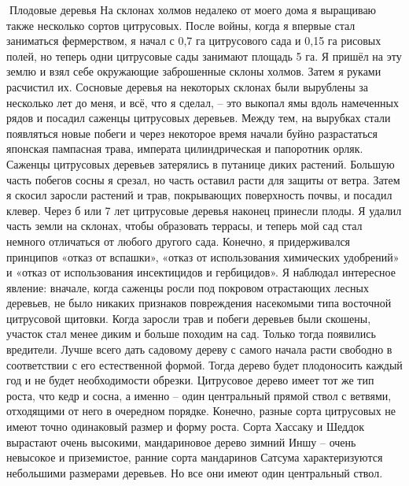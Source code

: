 \documentclass[a4paper]{book}
\begin{document}
Плодовые деревья
На склонах холмов недалеко от моего дома я выращиваю также несколько сортов
цитрусовых. После войны, когда я впервые стал заниматься фермерством, я начал с 0,7 га
цитрусового сада и 0,15 га рисовых полей, но теперь одни цитрусовые сады занимают
площадь 5 га. Я пришёл на эту землю и взял себе окружающие заброшенные склоны холмов.
Затем я руками расчистил их.
Сосновые деревья на некоторых склонах были вырублены за несколько лет до меня, и
всё, что я сделал, – это выкопал ямы вдоль намеченных рядов и посадил саженцы цитрусовых
деревьев. Между тем, на вырубках стали появляться новые побеги и через некоторое время
начали буйно разрастаться японская пампасная трава, императа цилиндрическая и
папоротник орляк. Саженцы цитрусовых деревьев затерялись в путанице диких растений.
Большую часть побегов сосны я срезал, но часть оставил расти для защиты от ветра.
Затем я скосил заросли растений и трав, покрывающих поверхность почвы, и посадил
клевер. Через б или 7 лет цитрусовые деревья наконец принесли плоды. Я удалил часть
земли на склонах, чтобы образовать террасы, и теперь мой сад стал немного отличаться от
любого другого сада.
Конечно, я придерживался принципов «отказ от вспашки», «отказ от использования
химических удобрений» и «отказ от использования инсектицидов и гербицидов». Я
наблюдал интересное явление: вначале, когда саженцы росли под покровом отрастающих
лесных деревьев, не было никаких признаков повреждения насекомыми типа восточной
цитрусовой щитовки. Когда заросли трав и побеги деревьев были скошены, участок стал
менее диким и больше походим на сад. Только тогда появились вредители.
Лучше всего дать садовому дереву с самого начала расти свободно в соответствии с его
естественной формой. Тогда дерево будет плодоносить каждый год и не будет необходимости
обрезки. Цитрусовое дерево имеет тот же тип роста, что кедр и сосна, а именно – один
центральный прямой ствол с ветвями, отходящими от него в очередном порядке. Конечно,
разные сорта цитрусовых не имеют точно одинаковый размер и форму роста. Сорта Хассаку
и Шеддок вырастают очень высокими, мандариновое дерево зимний Иншу – очень
невысокое и приземистое, ранние сорта мандаринов Сатсума характеризуются небольшими
размерами деревьев. Но все они имеют один центральный ствол.
\end{document}
